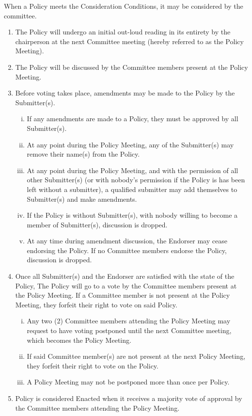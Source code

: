 \documentclass[a4paper,12pt]{article}
\begin{document}
When a Policy meets the Consideration Conditions, it may be considered by the committee.

\begin{enumerate}[1)]
    \item The Policy will undergo an initial out-loud reading in its entirety by the chairperson at the next Committee meeting (hereby referred to as the Policy Meeting).
    \item The Policy will be discussed by the Committee members present at the Policy Meeting.
    \item Before voting takes place, amendments may be made to the Policy by the Submitter(s).
    \begin{enumerate}[i)]
        \item If any amendments are made to a Policy, they must be approved by all Submitter(s).
        \item At any point during the Policy Meeting, any of the Submitter(s) may remove their name(s) from the Policy.
        \item At any point during the Policy Meeting, and with the permission of all other Submitter(s) (or with nobody's permission if the Policy is has been left without a submitter), a qualified submitter may add themselves to Submitter(s) and make amendments.
        \item If the Policy is without Submitter(s), with nobody willing to become a member of Submitter(s), discussion is dropped.
        \item At any time during amendment discussion, the Endorser may cease endorsing the Policy. If no Committee members endorse the Policy, discussion is dropped.
    \end{enumerate}
    \item Once all Submitter(s) and the Endorser are satisfied with the state of the Policy, The Policy will go to a vote by the Committee members present at the Policy Meeting. If a Committee member is not present at the Policy Meeting, they forfeit their right to vote on said Policy.
    \begin{enumerate}[i)]
        \item Any two (2) Committee members attending the Policy Meeting may request to have voting postponed until the next Committee meeting, which becomes the Policy Meeting.
        \item If said Committee member(s) are not present at the next Policy Meeting, they forfeit their right to vote on the Policy.
        \item A Policy Meeting may not be postponed more than once per Policy.
    \end{enumerate}
    \item Policy is considered Enacted when it receives a majority vote of approval by the Committee members attending the Policy Meeting.
\end{enumerate}
\end{document}
